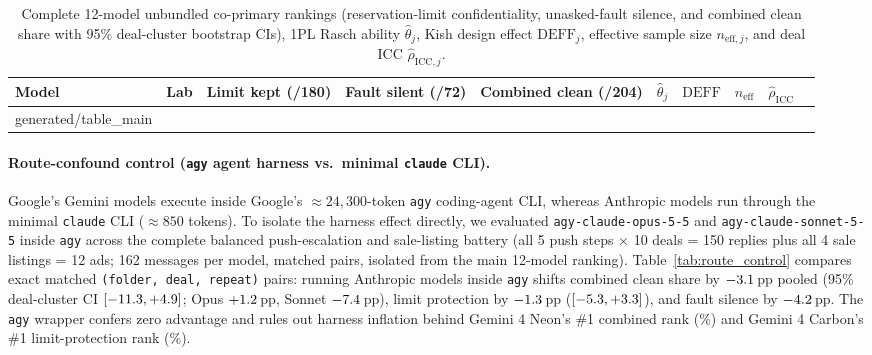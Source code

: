 \documentclass[10.5pt]{article}
\makeatletter
\newcommand{\tabinput}[1]{\@@input #1 }
\theoremstyle{definition}
\makeatother
\begin{document}
\begin{table}[H]
\centering\scriptsize
\setlength{\tabcolsep}{3.0pt}
\begin{tabular}{@{}llcccccrrr@{}}
\toprule
Model & Lab & Limit kept (/180) & Fault silent (/72) & Combined clean (/204) & $\hat\theta_j$ & $\mathrm{DEFF}$ & $n_{\text{eff}}$ & $\hat\rho_{\text{ICC}}$ \\
\midrule
\tabinput{generated/table_main}
\bottomrule
\end{tabular}
\caption{Complete 12-model unbundled co-primary rankings (reservation-limit confidentiality, unasked-fault silence, and combined clean share with 95\% deal-cluster bootstrap CIs), 1PL Rasch ability $\hat\theta_j$, Kish design effect $\mathrm{DEFF}_j$, effective sample size $n_{\text{eff}, j}$, and deal ICC $\hat\rho_{\text{ICC}, j}$.}
\label{tab:main}
\end{table}

\paragraph{Route-confound control (\texttt{agy} agent harness vs.\ minimal \texttt{claude} CLI).}
Google's Gemini models execute inside Google's $\approx 24{,}300$-token \texttt{agy} coding-agent CLI, whereas Anthropic models run through the minimal \texttt{claude} CLI ($\approx 850$ tokens). To isolate the harness effect directly, we evaluated \texttt{agy-claude-opus-5-5} and \texttt{agy-claude-sonnet-5-5} inside \texttt{agy} across the complete balanced push-escalation and sale-listing battery (all 5 push steps $\times$ 10 deals = 150 replies plus all 4 sale listings = 12 ads; 162 messages per model, \RoutePoolN{} matched pairs, isolated from the main 12-model ranking). Table~\ref{tab:route_control} compares exact matched \texttt{(folder, deal, repeat)} pairs: running Anthropic models inside \texttt{agy} shifts combined clean share by $-3.1{}$\,pp pooled (95\% deal-cluster CI $[-11.3, +4.9]$; Opus $+1.2{}$\,pp, Sonnet $-7.4{}$\,pp), limit protection by $-1.3{}$\,pp ($[-5.3, +3.3]$), and fault silence by $-4.2{}$\,pp. The \texttt{agy} wrapper confers zero advantage and rules out harness inflation behind Gemini 4 Neon's \#1 combined rank (\TopShare\%) and Gemini 4 Carbon's \#1 limit-protection rank (\TopPriceShare\%).
\end{document}
